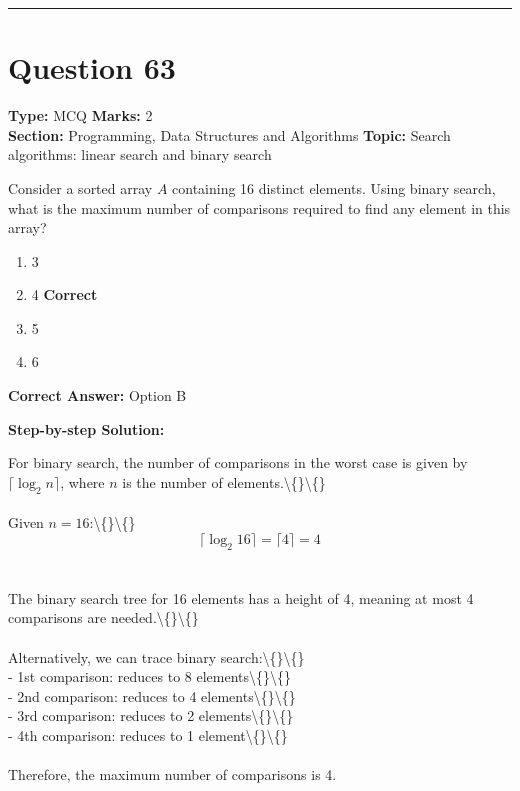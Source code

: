 \documentclass[11pt]{article}
\begin{document}
\vspace{0.8em}
\hrule
\vspace{0.4em}
\section*{Question 63}
\textbf{Type:} MCQ \hfill \textbf{Marks:} 2\\
\textbf{Section:} Programming, Data Structures and Algorithms \hfill \textbf{Topic:} Search algorithms: linear search and binary search

Consider a sorted array \(A\) containing 16 distinct elements. Using binary search, what is the maximum number of comparisons required to find any element in this array?


\begin{enumerate}[label=\textbf{\Alph*.}, leftmargin=1.8em]
\item 3\item 4 \hfill {\color{gategreen}\textbf{Correct}}\item 5\item 6\end{enumerate}

\textbf{Correct Answer:} Option B

\textbf{Step-by-step Solution:}

For binary search, the number of comparisons in the worst case is given by \(\lceil \log_2 n \rceil\), where \(n\) is the number of elements.\textbackslash\{\}\textbackslash\{\}\\
\\
Given \(n = 16\):\textbackslash\{\}\textbackslash\{\}\\
\[\lceil \log_2 16 \rceil = \lceil 4 \rceil = 4\]\\
\\
The binary search tree for 16 elements has a height of 4, meaning at most 4 comparisons are needed.\textbackslash\{\}\textbackslash\{\}\\
\\
Alternatively, we can trace binary search:\textbackslash\{\}\textbackslash\{\}\\
- 1st comparison: reduces to 8 elements\textbackslash\{\}\textbackslash\{\}\\
- 2nd comparison: reduces to 4 elements\textbackslash\{\}\textbackslash\{\}\\
- 3rd comparison: reduces to 2 elements\textbackslash\{\}\textbackslash\{\}\\
- 4th comparison: reduces to 1 element\textbackslash\{\}\textbackslash\{\}\\
\\
Therefore, the maximum number of comparisons is 4.
\end{document}
